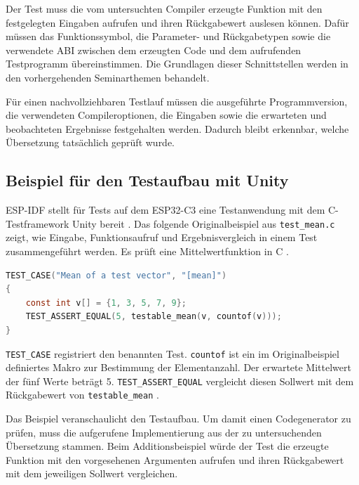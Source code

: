 \documentclass[11pt,a4paper]{article}
\newcommand{\code}[1]{\texttt{#1}}
\begin{document}
Der Test muss die vom untersuchten Compiler erzeugte Funktion
mit den festgelegten Eingaben aufrufen und ihren Rückgabewert
auslesen können. Dafür müssen das Funktionssymbol, die Parameter-
und Rückgabetypen sowie die verwendete ABI zwischen dem erzeugten
Code und dem aufrufenden Testprogramm übereinstimmen. Die Grundlagen
dieser Schnittstellen werden in den vorhergehenden Seminarthemen
behandelt.

Für einen nachvollziehbaren Testlauf müssen die ausgeführte
Programmversion, die verwendeten Compileroptionen, die Eingaben
sowie die erwarteten und beobachteten Ergebnisse festgehalten
werden. Dadurch bleibt erkennbar, welche Übersetzung tatsächlich
geprüft wurde.

\subsection{Beispiel für den Testaufbau mit Unity}
ESP-IDF stellt für Tests auf dem ESP32-C3 eine Testanwendung mit
dem C-Testframework Unity bereit \parencite{esptests}. Das folgende
Originalbeispiel aus \code{test\_mean.c} zeigt, wie Eingabe,
Funktionsaufruf und Ergebnisvergleich in einem Test zusammengeführt
werden. Es prüft eine Mittelwertfunktion in C \parencite{espmean}.

\par\noindent\begin{minipage}{\linewidth}
\begin{lstlisting}[language=C,caption={Originaltest aus dem ESP-IDF-Beispiel test\_mean.c}]
TEST_CASE("Mean of a test vector", "[mean]")
{
    const int v[] = {1, 3, 5, 7, 9};
    TEST_ASSERT_EQUAL(5, testable_mean(v, countof(v)));
}
\end{lstlisting}
\end{minipage}\par

\code{TEST\_CASE} registriert den benannten Test.
\code{countof} ist ein im Originalbeispiel definiertes Makro zur
Bestimmung der Elementanzahl. Der erwartete Mittelwert der fünf
Werte beträgt 5. \code{TEST\_ASSERT\_EQUAL} vergleicht diesen Sollwert
mit dem Rückgabewert von \code{testable\_mean} \parencite{espmean}.

Das Beispiel veranschaulicht den Testaufbau. Um damit einen
Codegenerator zu prüfen, muss die aufgerufene Implementierung aus
der zu untersuchenden Übersetzung stammen. Beim Additionsbeispiel
würde der Test die erzeugte Funktion mit den vorgesehenen
Argumenten aufrufen und ihren Rückgabewert mit dem jeweiligen
Sollwert vergleichen.
\end{document}
